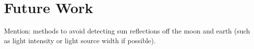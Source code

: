 \chapter{Future Work}
Mention: methods to avoid detecting sun reflections off the moon and earth (such as light intensity or light source width if possible).